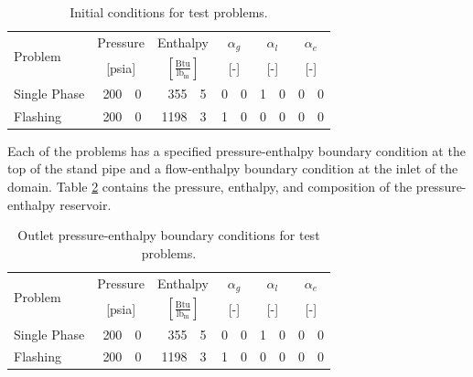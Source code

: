 \begin{table}[ht]
\centering
\begin{tabular}{@{}lr@{.}lr@{.}lr@{.}lr@{.}lr@{.}l@{}} \toprule
\multirow{2}{*}{Problem} & \multicolumn{2}{c}{Pressure} & \multicolumn{2}{c}{Enthalpy}             & \multicolumn{2}{c}{$\alpha_g$} & \multicolumn{2}{c}{$\alpha_l$} & \multicolumn{2}{c}{$\alpha_e$} \\ 
                         & \multicolumn{2}{c}{[psia]} & \multicolumn{2}{c}{$[\frac{\text{Btu}}{\text{lb}_{\text{m}}}]$} & \multicolumn{2}{c}{[-]}      & \multicolumn{2}{c}{[-]}      & \multicolumn{2}{c}{[-]}      \\ \midrule
Single Phase             &  200&0                       &  355&5                                   & 0&0                            & 1&0                            & 0&0 \\
Flashing                 &  200&0                       & 1198&3                                   & 1&0                            & 0&0                            & 0&0 \\ \bottomrule  
\end{tabular}
\caption{Initial conditions for test problems.}
\label{tab:ic}
\end{table}

Each of the problems has a specified pressure-enthalpy boundary condition at the top of the stand pipe and a flow-enthalpy boundary condition at the inlet of the domain.
Table \ref{tab:bc_pe} contains the pressure, enthalpy, and composition of the pressure-enthalpy reservoir. 

\begin{table}[ht]
\centering
\begin{tabular}{@{}lr@{.}lr@{.}lr@{.}lr@{.}lr@{.}l@{}} \toprule
\multirow{2}{*}{Problem} & \multicolumn{2}{c}{Pressure} & \multicolumn{2}{c}{Enthalpy}             & \multicolumn{2}{c}{$\alpha_g$} & \multicolumn{2}{c}{$\alpha_l$} & \multicolumn{2}{c}{$\alpha_e$} \\ 
                         & \multicolumn{2}{c}{[psia]} & \multicolumn{2}{c}{$[\frac{\text{Btu}}{\text{lb}_{\text{m}}}]$} & \multicolumn{2}{c}{[-]}      & \multicolumn{2}{c}{[-]}      & \multicolumn{2}{c}{[-]}      \\ \midrule
Single Phase             &  200&0                       &  355&5                                   & 0&0                            & 1&0                            & 0&0 \\
Flashing                 &  200&0                       & 1198&3                                   & 1&0                            & 0&0                            & 0&0 \\ \bottomrule  
\end{tabular}
\caption{Outlet pressure-enthalpy boundary conditions for test problems.}
\label{tab:bc_pe}
\end{table}

